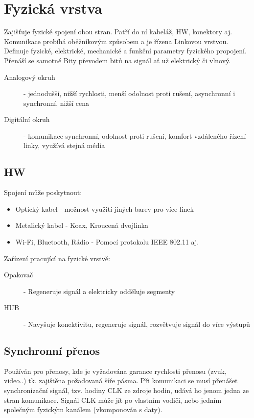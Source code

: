 \section{Fyzická vrstva}
  Zajišťuje fyzické spojení obou stran.
  Patří do ní kabeláž, HW, konektory aj.
  Komunikace probíhá oběžníkovým způsobem a je řízena Linkovou vrstvou.
  Definuje fyzické, elektrické, mechanické a funkční parametry fyzického propojení.
  Přenáší se samotné Bity převodem bitů na signál ať už elektrický či vlnový.\\
  \begin{description}
    \item[Analogový okruh]- jednodušší, nižší rychlosti, menší odolnost proti rušení, asynchronní i synchronní, nižší cena
    \item[Digitální okruh]- komunikace synchronní, odolnost proti rušení, komfort vzdáleného řízení linky, využívá stejná média\\
  \end{description}
  \subsection{HW}
    Spojení může poskytnout:
    \begin{itemize}
      \item Optický kabel - možnost využití jiných barev pro více linek
      \item Metalický kabel - Koax, Kroucená dvojlinka
      \item Wi-Fi, Bluetooth, Rádio - Pomocí protokolu IEEE 802.11 aj.\\
    \end{itemize}
    Zařízení pracující na fyzické vrstvě:
    \begin{description}
      \item[Opakovač]- Regeneruje signál a elektricky odděluje segmenty
      \item[HUB]- Navyšuje konektivitu, regeneruje signál, rozvětvuje signál do více výstupů\\
    \end{description}
  \subsection{Synchronní přenos}
    Používán pro přenosy, kde je vyžadována garance rychlosti přenosu (zvuk, video..) tk. zajištěna požadovaná šíře pásma.
    Při komunikaci se musí přenášet synchronizační signál, tzv. hodiny CLK ze zdroje hodin, udává ho jenom jedna ze stran komunikace.
    Signál CLK může jít po vlastním vodiči, nebo jedním společným fyzickým kanálem (vkomponován s daty).
